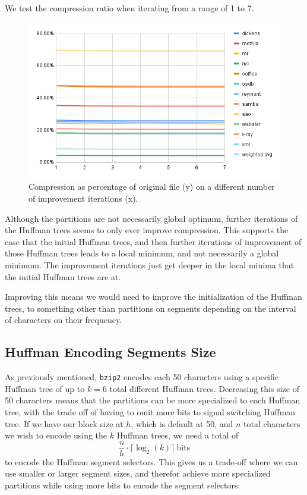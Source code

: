 \documentclass{article}
\begin{document}
We test the compression ratio when iterating from a range of 1 to 7.
\begin{figure}[H]
    \centering
    \includegraphics[width=\textwidth]{images/treesIterationsCount.png}
    \caption{Compression as percentage of original file (y) on a different number of improvement iterations (x).}
\end{figure}
Although the partitions are not necessarily global optimum, further iterations of the Huffman trees seems to only ever improve compression. This supports the case that the initial Huffman trees, and then further iterations of improvement of those Huffman trees leads to a local minimum, and not necessarily a global minimum. The improvement iterations just get deeper in the local minima that the initial Huffman trees are at.

Improving this means we would need to improve the initialization of the Huffman trees, to something other than partitions on segments depending on the interval of characters on their frequency.

\subsection{Huffman Encoding Segments Size}
As previously mentioned, \texttt{bzip2} encodes each 50 characters using a specific Huffman tree of up to \(k=6\) total different Huffman trees. Decreasing this size of 50 characters means that the partitions can be more specialized to each Huffman tree, with the trade off of having to omit more bits to signal switching Huffman tree. If we have our block size at \(h\), which is default at 50, and \(n\) total characters we wish to encode using the \(k\) Huffman trees, we need a total of
\[
    \frac{n}{h} \cdot \lceil\log_2{(k)}\rceil \ \text{bits}
\]
to encode the Huffman segment selectors. This gives us a trade-off where we can use smaller or larger segment sizes, and therefor achieve more specialized partitions while using more bits to encode the segment selectors.
\end{document}
